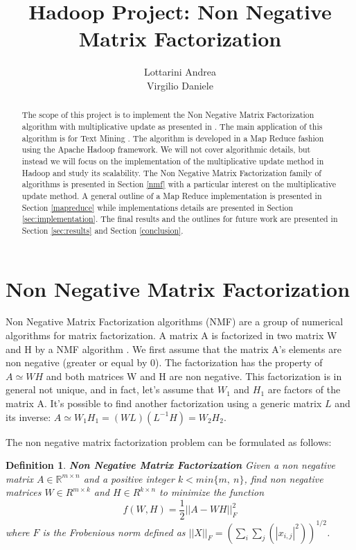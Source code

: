 \documentclass[a4paper,12pt]{article}
\title{Hadoop Project: Non Negative Matrix Factorization}
\author{Lottarini Andrea \\ Virgilio Daniele}
\newtheorem{mydef}{Definition}[section]
\begin{document}
\maketitle

\begin{abstract}

The scope of this project is to implement the Non Negative Matrix Factorization algorithm with multiplicative update as presented in \citep{liu2010}.
The main application of this algorithm is for Text Mining \cite{05abstractemail}.
The algorithm is developed in a Map Reduce fashion using the Apache Hadoop framework.
We will not cover algorithmic details, but instead we will focus on the implementation of the multiplicative update method in Hadoop and study its scalability.
The Non Negative Matrix Factorization family of algorithms is presented in Section \ref{nmf} with a particular interest on the   multiplicative update method. 
A general outline of a Map Reduce implementation is presented in Section \ref{mapreduce} while implementations details are presented in Section \ref{sec:implementation}.
The final results and the outlines for future work are presented in Section \ref{sec:results} and Section \ref{conclusion}.

\end{abstract}

\section{Non Negative Matrix Factorization}
\label{nmf}

Non Negative Matrix Factorization algorithms (NMF) are a group of numerical algorithms for matrix factorization.
A matrix A is factorized in two matrix W and H by a NMF algorithm . 
We first assume that the matrix A's elements are non negative (greater or equal by 0). 
The factorization has the property of $ A \simeq W H $ and both matrices W and H are non negative. 
This factorization is in general not unique, and in fact, let's assume that $W_1$ and $H_1$ are factors of the matrix A.
It's possible to find another factorization using a generic matrix $L$ and its inverse: $A \simeq W_1 H_1 = ( W L ) (L^{-1} H) = W_2 H_2  $. 

The non negative matrix factorization problem can be formulated as follows:
\begin{mydef} \textbf{Non Negative Matrix Factorization}
  Given a non negative matrix $A \in \mathbb{R}^{m×n}$ and a positive integer $k<min\{m,~n\} $, find non 	
  	negative matrices $W \in R^{m×k}$ and $H \in R^{k×n}$ to minimize the function  
  	$$ f ( W , H ) = \frac{1}{2} || A − W H ||_F^2$$ where $F$ is the Frobenious norm defined as
  	$|| X ||_F = ( \sum_i \sum_j( |x_{i,j}|^2 ) )^{1/2}$. 
  	\label{def:nmf}
\end{mydef}
\end{document}
